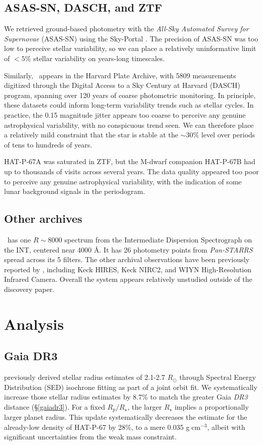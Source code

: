 \documentclass[twocolumn]{aastex631}
\newcommand{\hatp}{\object{HAT-P-67}~}
\begin{document}
\subsection{ASAS-SN, DASCH, and ZTF}
We retrieved ground-based photometry with the \emph{All-Sky Automated Survey for Supernovae} (ASAS-SN) using the Sky-Portal \citep{shappee14,2017PASP..129j4502K}.  The precision of ASAS-SN was too low to perceive stellar variability, so we can place a relatively uninformative limit of $<5\%$ stellar variability on years-long timescales.

Similarly, \hatp appears in the Harvard Plate Archive, with 5809 measurements digitized through the Digital Access to a Sky Century at Harvard (DASCH) program, spanning over 120 years of coarse photometric monitoring.  In principle, these datasets could inform long-term variability trends such as stellar cycles.  In practice, the 0.15 magnitude jitter appears too coarse to perceive any genuine astrophysical variability, with no conspicuous trend seen.  We can therefore place a relatively mild constraint that the star is stable at the $\sim30\%$ level over periods of tens to hundreds of years.

HAT-P-67A was saturated in ZTF, but the M-dwarf companion HAT-P-67B had up to thousands of visits across several years.  The data quality appeared too poor to perceive any genuine astrophysical variability, with the indication of some lunar background signals in the periodogram.

\subsection{Other archives}
\hatp has one $R\sim8000$ spectrum from the Intermediate Dispersion Spectrograph on the INT, centered near 4000 \AA.  It has 26 photometry points from \emph{Pan-STARRS} spread across its 5 filters.  The other archival observations have been previously reported by \citet{2017AJ....153..211Z}, including Keck HIRES, Keck NIRC2, and WIYN High-Resolution Infrared Camera.  Overall the system appears relatively unstudied outside of the discovery paper.


\section{Analysis}

\subsection{Gaia DR3}\label{analysisgaiaDR3}
\citet{2017AJ....153..211Z} previously derived stellar radius estimates of 2.1-2.7 $R_\odot$ through Spectral Energy Distribution (SED) isochrone fitting as part of a joint orbit fit.  We systematically increase those stellar radius estimates by 8.7\% to match the greater Gaia \emph{DR3} distance (\S \ref{gaiadr3}).  For a fixed $R_p/R_\star$, the larger $R_\star$ implies a proportionally larger planet radius. This update systematically decreases the estimate for the already-low density of HAT-P-67 by 28\%, to a mere 0.035 g$\;$cm$^{-3}$, albeit with significant uncertainties from the weak mass constraint.
\end{document}
